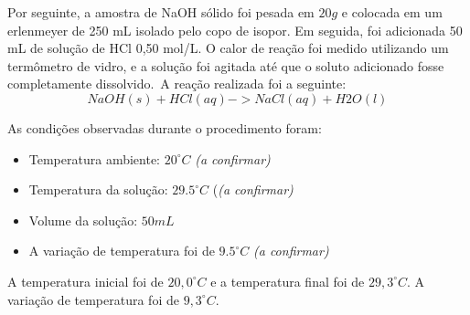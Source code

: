         \indent Por seguinte, a amostra de NaOH sólido foi pesada em $20g$ e colocada em um erlenmeyer de 250 mL isolado pelo copo de isopor. Em seguida, foi adicionada 50 mL de solução de HCl 0,50 mol/L. O calor de reação foi medido utilizando um termômetro de vidro, e a solução foi agitada até que o soluto adicionado fosse completamente dissolvido.\ A reação realizada foi a seguinte:\
        \begin{equation}
            {NaOH(s) + HCl(aq) -> NaCl(aq) + H2O(l)}
        \end{equation}
    	
    	\indent As condições observadas durante o procedimento foram:
    	\begin{itemize}
    		\item Temperatura ambiente: $20^{\circ}C$ \textit{(a confirmar)}
    		\item Temperatura da solução: $29.5^{\circ}C$ (\textit{(a confirmar)}
    		\item Volume da solução: $50 mL$
    		\item A variação de temperatura foi de $9.5^{\circ}C$ \textit{(a confirmar)}
    	\end{itemize}
    
    	\indent A temperatura inicial foi de $20,0^{\circ} C$ e a temperatura final foi de $29,3^{\circ}C$. A variação de temperatura foi de $9,3^{\circ} C$.\\
                

